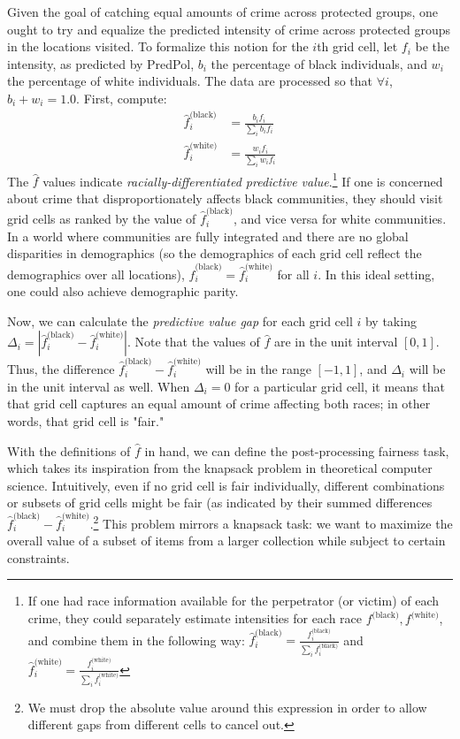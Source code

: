 Given the goal of catching equal amounts of crime across protected groups, one ought to try and equalize the predicted intensity of crime across protected groups in the locations visited. To formalize this notion for the $i$th grid cell, let $f_i$ be the intensity, as predicted by PredPol, $b_i$ the percentage of black individuals, and $w_i$ the percentage of white individuals. The data are processed so that $\forall i$, $b_i + w_i = 1.0$. First, compute:
\begin{align}
\hat{f}^{\text{(black)}}_i &= \frac{b_i f_i}{\sum_i b_i f_i}\\
\hat{f}^{\text{(white)}}_i &= \frac{w_i f_i}{\sum_i w_i f_i}
\end{align}
The $\hat{f}$ values indicate \emph{racially-differentiated predictive
value}.\footnote{If one had race information available for the perpetrator (or victim) of each crime, they could separately estimate intensities for each race $f^{\text{(black)}}, f^{\text{(white)}}$, and combine them in the following way: $
\hat{f}^{\text{(black)}}_i = \frac{f^{\text{(black)}}_i}{\sum_i f^{\text{(black)}}_i}$ and $
\hat{f}^{\text{(white)}}_i = \frac{f^{\text{(white)}}_i}{\sum_i f^{\text{(white)}}_i}
$} If one is concerned about crime that disproportionately affects black communities, they should visit grid cells as ranked by the value of $\hat{f}^{\text{(black)}}_i$, and vice versa for white communities. In a world where communities are fully integrated and there are no global disparities in demographics (so the demographics of each grid cell reflect the demographics over all locations), $\hat{f}^{\text{(black)}}_i = \hat{f}^{\text{(white)}}_i$ for all $i$. In this ideal setting, one could also achieve demographic parity.

Now, we can calculate the \emph{predictive value gap} for each grid cell $i$ by taking $\Delta_i = |\hat{f}^{\text{(black)}}_i - \hat{f}^{\text{(white)}}_i|$.
Note that the values of $\hat{f}$ are in the unit interval $[0, 1]$.
Thus, the difference $\hat{f}^{\text{(black)}}_i - \hat{f}^{\text{(white)}}_i$ will be in the range $[-1, 1]$, and $\Delta_i$ will be in the unit interval as well. When $\Delta_i = 0$ for a particular grid cell, it means that that grid cell captures an equal amount of crime affecting both races; in other words, that grid cell is "fair."

With the definitions of $\hat{f}$ in hand, we can define the post-processing fairness task, which takes its inspiration from the knapsack problem in theoretical computer science. Intuitively, even if no grid cell is fair individually, different combinations or subsets of grid cells might be fair (as indicated by their summed differences $\hat{f}^{\text{(black)}}_i - \hat{f}^{\text{(white)}}_i$.\footnote{We must drop the absolute value around this expression in order to allow different gaps from different cells to cancel out.} This problem mirrors a knapsack task: we want to maximize the overall value of a subset of items from a larger collection while subject to certain constraints.

